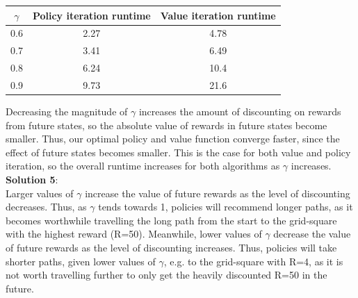 \documentclass[submit]{harvardml}
\begin{document}
\begin{center}
        \begin{tabular}{ |c|c|c| } 
        \hline
        \texttt{$\gamma$} & Policy iteration runtime & Value iteration runtime \\
        \hline
        0.6 & 2.27 & 4.78\\
        \hline
        0.7 & 3.41 & 6.49\\
        \hline
        0.8 & 6.24 & 10.4\\
        \hline
        0.9 & 9.73 & 21.6\\
        \hline
        \end{tabular}
\end{center}
Decreasing the magnitude of $\gamma$ increases the amount of discounting on rewards from future states, so the absolute value of rewards in future states become smaller. Thus, our optimal policy and value function converge faster, since the effect of future states becomes smaller. This is the case for both value and policy iteration, so the overall runtime increases for both algorithms as $\gamma$ increases.\\

\textbf{Solution 5}:\\
Larger values of $\gamma$ increase the value of future rewards as the level of discounting decreases. Thus, as $\gamma$ tends towards 1, policies will recommend longer paths, as it becomes worthwhile travelling the long path from the start to the grid-square with the highest reward (R=50). Meanwhile, lower values of $\gamma$ decrease the value of future rewards as the level of discounting increases. Thus, policies will take shorter paths, given lower values of $\gamma$, e.g. to the grid-square with R=4, as it is not worth travelling further to only get the heavily discounted R=50 in the future.
\end{document}
